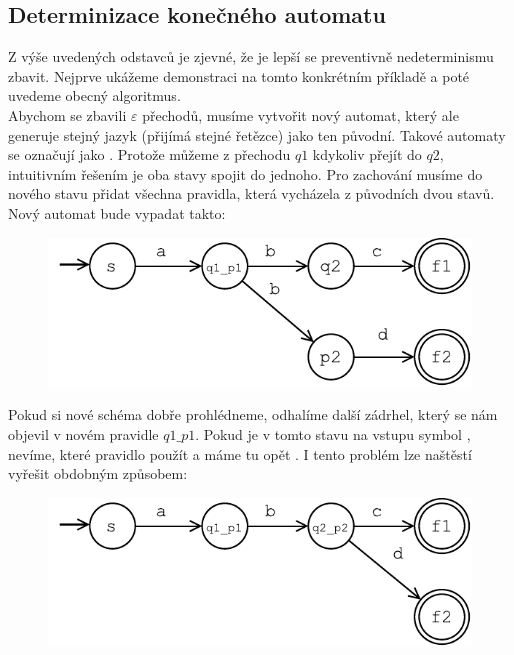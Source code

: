 \subsection{Determinizace konečného automatu}

Z výše uvedených odstavců je zjevné, že je lepší se preventivně nedeterminismu
zbavit. Nejprve ukážeme demonstraci na tomto konkrétním příkladě a poté uvedeme
obecný algoritmus.\\

Abychom se zbavili $\varepsilon$ přechodů, musíme vytvořit nový automat, který ale
generuje stejný jazyk (přijímá stejné řetězce)
jako ten původní. Takové automaty se označují jako .
Protože můžeme z přechodu $q1$ kdykoliv přejít do $q2$, intuitivním řešením
je oba stavy spojit do jednoho. Pro zachování  musíme
do nového stavu přidat všechna pravidla, která vycházela z původních dvou stavů.
Nový automat bude vypadat takto:

\begin{figure}[H]
  \centering
  \includegraphics{fig/finiteAutomat1_1.pdf}
\end{figure}

Pokud si nové schéma dobře prohlédneme, odhalíme další zádrhel, který se nám
objevil v novém pravidle $q1\_p1$. Pokud je v tomto stavu na vstupu symbol ,
nevíme, které pravidlo použít a máme tu opět .
I tento problém lze naštěstí vyřešit obdobným způsobem:

\begin{figure}[H]
  \centering
  \includegraphics{fig/finiteAutomat1_2.pdf}
\end{figure}

